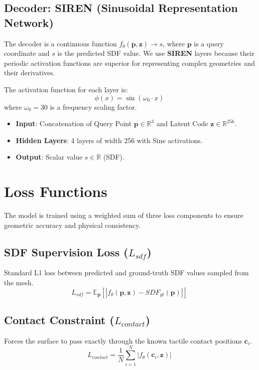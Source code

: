 \documentclass[11pt,a4paper]{article}
\begin{document}
\subsection{Decoder: SIREN (Sinusoidal Representation Network)}
The decoder is a continuous function $f_\theta(\mathbf{p}, \mathbf{z}) \to s$, where $\mathbf{p}$ is a query coordinate and $s$ is the predicted SDF value. We use \textbf{SIREN} layers because their periodic activation functions are superior for representing complex geometries and their derivatives.

The activation function for each layer is:
\begin{equation}
    \phi(x) = \sin(\omega_0 \cdot x)
\end{equation}
where $\omega_0 = 30$ is a frequency scaling factor.

\begin{itemize}
    \item \textbf{Input}: Concatenation of Query Point $\mathbf{p} \in \mathbb{R}^3$ and Latent Code $\mathbf{z} \in \mathbb{R}^{256}$.
    \item \textbf{Hidden Layers}: 4 layers of width 256 with Sine activations.
    \item \textbf{Output}: Scalar value $s \in \mathbb{R}$ (SDF).
\end{itemize}

\section{Loss Functions}
The model is trained using a weighted sum of three loss components to ensure geometric accuracy and physical consistency.

\subsection{SDF Supervision Loss ($L_{sdf}$)}
Standard L1 loss between predicted and ground-truth SDF values sampled from the mesh.
\begin{equation}
    L_{sdf} = \mathbb{E}_{\mathbf{p}} [ | f_\theta(\mathbf{p}, \mathbf{z}) - SDF_{gt}(\mathbf{p}) | ]
\end{equation}

\subsection{Contact Constraint ($L_{contact}$)}
Forces the surface to pass exactly through the known tactile contact positions $\mathbf{c}_i$.
\begin{equation}
    L_{contact} = \frac{1}{N} \sum_{i=1}^N | f_\theta(\mathbf{c}_i, \mathbf{z}) |
\end{equation}
\end{document}
